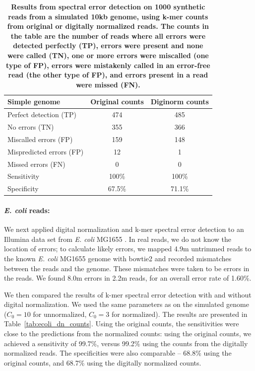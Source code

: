 \documentclass{article}
\begin{document}

\begin{table}
\centering

\begin{tabular}{|l|c|c|}
\hline
{\bf Simple genome} & Original counts & Diginorm counts \\
\hline
Perfect detection (TP) & 474 & 485 \\
No errors (TN) & 355 & 366 \\
Miscalled errors (FP) & 159 & 148 \\
Mispredicted errors (FP) & 12 & 1 \\
Missed errors (FN) & 0 & 0 \\
\hline
Sensitivity & 100\% & 100\% \\
Specificity & 67.5\% & 71.1\% \\
\hline
\end{tabular}

\caption{{\bf Results from spectral error detection on 1000 synthetic
    reads from a simulated 10kb genome, using k-mer counts from
    original or digitally normalized reads.  The counts in the table
    are the number of reads where all errors were detected perfectly
    (TP), errors were present and none were called (TN), one or more
    errors were miscalled (one type of FP), errors were mistakenly
    called in an error-free read (the other type of FP), and errors
    present in a read were missed (FN).}}
\label{tab:a}
\end{table}


\paragraph{{\em E. coli} reads:}
We next applied digital normalization and k-mer spectral error
detection to an Illumina data set from {\em E. coli} MG1655
\cite{pubmed21926975}.  In real reads, we do not know the location of
errors; to calculate likely errors, we mapped 4.9m untrimmed reads to
the known {\em E. coli} MG1655 genome with bowtie2 \cite{bowtie2} and
recorded mismatches between the reads and the genome.  These
mismatches were taken to be errors in the reads.  We found 8.0m errors
in 2.2m reads, for an overall error rate of 1.60\%.

We then compared the results of k-mer spectral error detection with
and without digital normalization.  We used the same parameters as on
the simulated genome ($C_0=10$ for unnormalized, $C_0=3$ for
normalized).  The results are presented in
Table~\ref{tab:ecoli_dn_counts}. Using the original counts, the
sensitivities were close to the predictions from the normalized
counts: using the original counts, we achieved a sensitivity of
99.7\%, versus 99.2\% using the counts from the digitally normalized
reads.  The specificities were also comparable -- 68.8\% using the original
counts, and 68.7\% using the digitally normalized counts.
\end{document}

